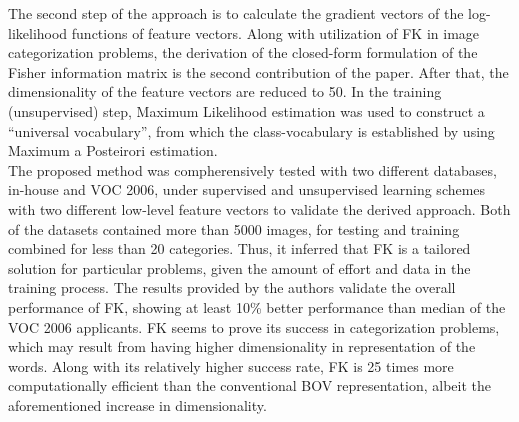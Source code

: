\documentclass[11pt]{article}
\begin{document}
The second step of the approach is to calculate the gradient vectors of the log-likelihood functions of feature vectors.
Along with utilization of FK in image categorization problems, the derivation of the closed-form formulation of the Fisher information matrix is the second contribution of the paper.
After that, the dimensionality of the feature vectors are reduced to 50.
In the training (unsupervised) step, Maximum Likelihood estimation was used to construct a ``universal vocabulary''\cite{perronnin2007fisher}, from which the class-vocabulary is established by using Maximum a Posteirori estimation. \\
\indent The proposed method was compherensively tested with two different databases, in-house and VOC 2006, under supervised and unsupervised learning schemes with two different low-level feature vectors to validate the derived approach.
Both of the datasets contained more than 5000 images, for testing and training combined for less than 20 categories.
Thus, it inferred that FK is a tailored solution for particular problems, given the amount of effort and data in the training process.
The results provided by the authors validate the overall performance of FK, showing at least 10\% better performance than median of the VOC 2006 applicants.
FK seems to prove its success in categorization problems, which may result from having higher dimensionality in representation of the words.
Along with its relatively higher success rate, FK is 25 times more computationally efficient than the conventional BOV representation, albeit the aforementioned  increase in dimensionality.


\end{document}
